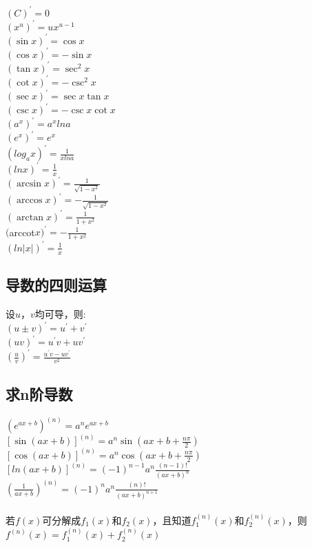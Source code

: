 \documentclass{article}
\begin{document}
\begin{flushleft}
	$(C)^{'}=0$\\
	$(x^u)^{'}=ux^{u-1}$\\
	$(\sin x)^{'}=\cos x$\\
	$(\cos x)^{'}=-\sin x$\\
	$(\tan x)^{'}=\sec^2 x$\\
	$(\cot x)^{'}=-\csc^2 x$\\
	$(\sec x)^{'}=\sec x\tan x$\\
	$(\csc x)^{'}=-\csc x\cot x$\\
	$(a^x)^{'}=a^xlna$\\
	$(e^x)^{'}=e^x$\\
	$(log_ax)^{'}=\frac{1}{xlna}$\\
	$(lnx)^{'}=\frac{1}{x}$\\
	$(\arcsin x)^{'}=\frac{1}{\sqrt{1-x^2}}$\\
	$(\arccos x)^{'}=-\frac{1}{\sqrt{1-x^2}}$\\
	$(\arctan x)^{'}=\frac{1}{1+x^2}$\\
	$($arccot$ x)^{'}=-\frac{1}{1+x^2}$\\
	$(ln|x|)^{'}=\frac{1}{x}$\\
	
	\subsection{导数的四则运算}
	
	设$u，v$均可导，则:\\
	$(u\pm v)^{'}=u^{'}+v^{'}$\\
	$(uv)^{'}=u^{'}v+uv^{'}$\\
	$(\frac{u}{v})^{'}=\frac{u^{'}v-uv^{'}}{v^2}$\\
	
	\subsection{求n阶导数}
	
	$(e^{ax+b})^{(n)}=a^ne^{ax+b}$\\
	$[\sin(ax+b)]^{(n)}=a^n\sin(ax+b+\frac{n\pi}{2})$\\
	$[\cos(ax+b)]^{(n)}=a^n\cos(ax+b+\frac{n\pi}{2})$\\
	$[ln(ax+b)]^{(n)}=(-1)^{n-1}a^n\frac{(n-1)!}{(ax+b)^n}$\\
	$(\frac{1}{ax+b})^{(n)}=(-1)^{n}a^n\frac{(n)!}{(ax+b)^{n+1}}$\\
	~\\
	若$f(x)$可分解成$f_1(x)$和$f_2(x)$，且知道$f_1^{(n)}(x)$和$f_2^{(n)}(x)$，则$f^{(n)}(x)=f_1^{(n)}(x)+f_2^{(n)}(x)$\\
	~\\

\end{flushleft}
\end{document}
